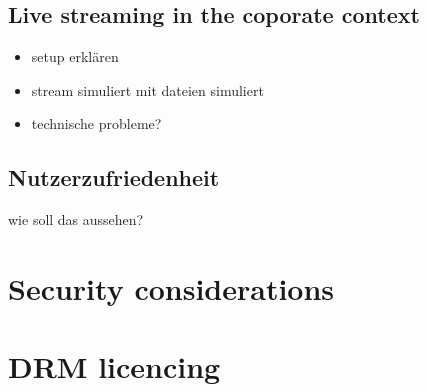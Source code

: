 \subsection{Live streaming in the coporate context}
\begin{itemize}
	\item setup erklären
	\item stream simuliert mit dateien simuliert
	\item technische probleme?
\end{itemize}

\subsection{Nutzerzufriedenheit}
wie soll das aussehen?

\section{Security considerations}
\section{DRM licencing}
